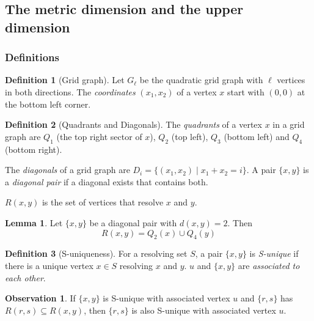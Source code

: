\documentclass[hyperref={pdfpagelabels=false}]{beamer}
\theoremstyle{definition}
\newtheorem{dfn}{Definition}
\newtheorem{obs}{Observation}
\theoremstyle{theorem}
\newtheorem{lem}{Lemma}
\begin{document}
\subsection{The metric dimension and the upper dimension}
\begin{frame}
	\frametitle{Definitions}
	\begin{dfn}[Grid graph]
		Let $G_\ell$ be the quadratic grid graph with $\ell$ vertices in both directions. The \emph{coordinates} $(x_1,x_2)$ of a vertex $x$ start with $(0,0)$ at the bottom left corner.
	\end{dfn}
	\begin{dfn}[Quadrants and Diagonals]
		The \emph{quadrants} of a vertex $x$ in a grid graph are $Q_1$ (the top right sector of $x$), $Q_2$ (top left), $Q_3$ (bottom left) and $Q_4$ (bottom right).

		The \emph{diagonals} of a grid graph are $D_i = \{ (x_1,x_2) \mid x_1 + x_2 = i \}$. A pair $\{x,y\}$ is a \emph{diagonal pair} if a diagonal exists that contains both.
	\end{dfn}
\end{frame}
\begin{frame}
	$R(x,y)$ is the set of vertices that resolve $x$ and $y$.
	\begin{lem}
		Let $\{x,y\}$ be a diagonal pair with $d(x,y) = 2$. Then
		\[ R(x,y) = Q_2(x) \cup Q_4(y) \]
	\end{lem}
\end{frame}
\begin{frame}
	\begin{dfn}[S-uniqueness]
		For a resolving set $S$, a pair $\{x,y\}$ is \emph{S-unique} if there is a unique vertex $x \in S$ resolving $x$ and $y$. $u$ and $\{x,y\}$ are \emph{associated to each other}.
	\end{dfn}
	\begin{obs}
		If $\{x,y\}$ is S-unique with associated vertex $u$ and $\{r,s\}$ has $R(r,s) \subseteq R(x,y)$, then $\{r,s\}$ is also S-unique with associated vertex $u$.
	\end{obs}
\end{frame}
\end{document}
